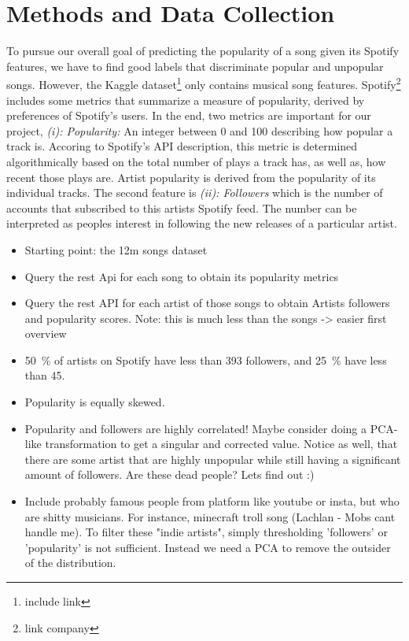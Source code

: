 \documentclass{article}
\begin{document}
\section{Methods and Data Collection}
To pursue our overall goal of predicting the popularity of a song given its Spotify features, we have to find good labels that discriminate popular and unpopular songs. 
However, the Kaggle dataset\footnote{include link} only contains musical song features. 
Spotify\footnote{link company} includes some metrics that summarize a measure of popularity, derived by preferences of Spotify's users. In the end, two metrics are important for our project, \textit{(i): Popularity:} An integer between 0 and 100 describing how popular a track is. Accoring to Spotify's API description, this metric is determined algorithmically based on the total number of plays a track has, as well as, how recent those plays are. Artist popularity is derived from the popularity of its individual tracks. The second feature is \textit{(ii): Followers} which is the number of accounts that subscribed to this artists Spotify feed. The number can be interpreted as peoples interest in following the new releases of a particular artist.
\begin{itemize}
  \item Starting point: the 12m songs dataset
  \item Query the rest Api for each song to obtain its popularity metrics
  \item Query the rest API for each artist of those songs to obtain Artists followers and popularity scores. Note: this is much less than the songs -> easier first overview
  \item \SI{50}{\percent} of artists on Spotify have less than 393 followers, and \SI{25}{\percent} have less than 45.
  \item Popularity is equally skewed.
  \item Popularity and followers are highly correlated! Maybe consider doing a PCA-like transformation to get a singular and corrected value. Notice as well, that there are some artist that are highly unpopular while still having a significant amount of followers. Are these dead people? Lets find out :)
  \item Include probably famous people from platform like youtube or insta, but who are shitty musicians. For instance, minecraft troll song (Lachlan - Mobs cant handle me).
  To filter these "indie artists", simply thresholding 'followers' or 'popularity' is not sufficient. Instead we need a PCA to remove the outsider of the distribution.
\end{itemize}
\end{document}
